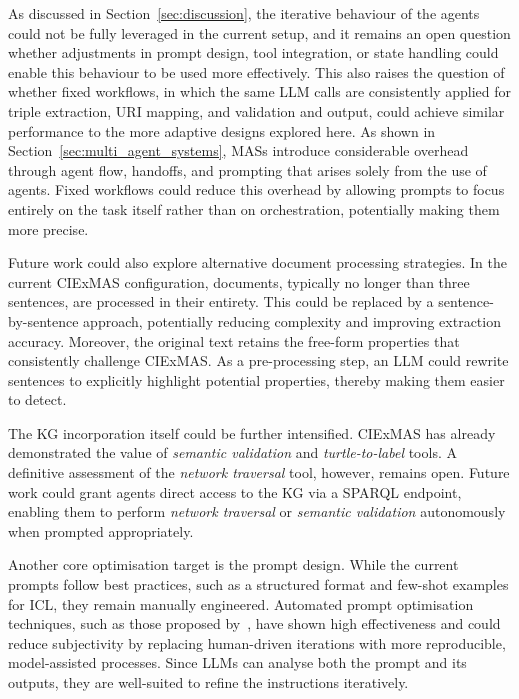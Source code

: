 \documentclass[a4paper,oneside,bibliography=totoc]{scrbook}
\begin{document}
As discussed in Section~\ref{sec:discussion}, the iterative behaviour of the agents could not be fully leveraged in the current setup, and it remains an open question whether adjustments in prompt design, tool integration, or state handling could enable this behaviour to be used more effectively. This also raises the question of whether fixed workflows, in which the same \ac{LLM} calls are consistently applied for triple extraction, \ac{URI} mapping, and validation and output, could achieve similar performance to the more adaptive designs explored here. As shown in Section~\ref{sec:multi_agent_systems}, \acp{MAS} introduce considerable overhead through agent flow, handoffs, and prompting that arises solely from the use of agents. Fixed workflows could reduce this overhead by allowing prompts to focus entirely on the task itself rather than on orchestration, potentially making them more precise.

Future work could also explore alternative document processing strategies. In the current CIExMAS configuration, documents, typically no longer than three sentences, are processed in their entirety. This could be replaced by a sentence-by-sentence approach, potentially reducing complexity and improving extraction accuracy. Moreover, the original text retains the free-form properties that consistently challenge CIExMAS. As a pre-processing step, an \ac{LLM} could rewrite sentences to explicitly highlight potential properties, thereby making them easier to detect.

The \ac{KG} incorporation itself could be further intensified. CIExMAS has already demonstrated the value of \textit{semantic validation} and \textit{turtle-to-label} tools. A definitive assessment of the \textit{network traversal} tool, however, remains open. Future work could grant agents direct access to the \ac{KG} via a \ac{SPARQL} endpoint, enabling them to perform \textit{network traversal} or \textit{semantic validation} autonomously when prompted appropriately.

Another core optimisation target is the prompt design. While the current prompts follow best practices, such as a structured format and few-shot examples for \ac{ICL}, they remain manually engineered. Automated prompt optimisation techniques, such as those proposed by~\citet{Agrawal2025}, have shown high effectiveness and could reduce subjectivity by replacing human-driven iterations with more reproducible, model-assisted processes. Since \acp{LLM} can analyse both the prompt and its outputs, they are well-suited to refine the instructions iteratively.
\end{document}
